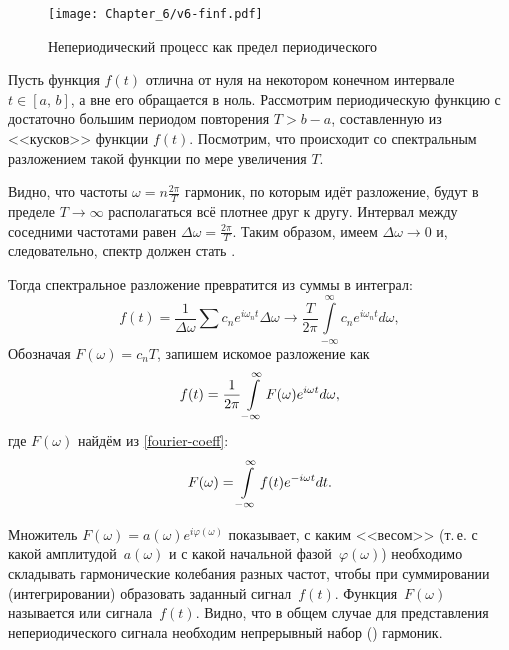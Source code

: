 \begin{wrapfigure}[9]{o}{0.5\textwidth}
    \centering\texttt{[image: Chapter\_6/v6-finf.pdf]}
    \caption{Непериодический процесс как предел периодического}
\end{wrapfigure}

Пусть функция $f(t)$ отлична от нуля на некотором конечном интервале
$t\in[a,\,b]$, а вне его обращается в ноль. Рассмотрим периодическую функцию
с достаточно большим периодом повторения $T>b-a$, составленную из <<кусков>>
функции $f(t)$. Посмотрим, что происходит со спектральным разложением
такой функции по мере увеличения $T$.

Видно, что частоты $\omega = n \frac{2\pi}{T}$ гармоник, по которым идёт
разложение, будут в пределе $T\to \infty$ располагаться всё плотнее друг к другу.
Интервал между соседними частотами равен $\Delta \omega = \frac{2\pi}{T}$.
Таким образом, имеем $\Delta \omega\to 0$ и, следовательно,
спектр должен стать .

Тогда спектральное разложение превратится из суммы в интеграл:
\begin{equation*}
 f(t) = \frac{1}{\Delta \omega}\sum c_n e^{i\omega_n t} \Delta \omega \to
 \frac{T}{2\pi} \int\limits_{-\infty}^{\infty} c_n e^{i\omega_n t} d\omega,
\end{equation*}
Обозначая $F(\omega)=c_n T$, запишем искомое разложение как
\begin{equation}
\eqmark{Fourier integral}
f(t) = \frac{1}{2\pi} \int\limits_{-\infty}^{\infty} F(\omega) e^{i\omega t} d\omega,
\end{equation}
где $F(\omega)$ найдём из \eqref{fourier-coeff}:
\begin{equation}
\eqmark{Fourier integral-coef}
 F(\omega) =
\int\limits_{-\infty}^{\infty} f(t) e^{-i\omega t} dt.
\end{equation}

Множитель $F(\omega)=a(\omega)e^{i\varphi(\omega)}$ показывает, с каким
<<весом>> (т.\,е. с какой амплитудой~$a(\omega)$ и с какой начальной 
фазой~$\varphi(\omega)$) необходимо складывать гармонические
колебания разных частот, чтобы при суммировании (интегрировании) образовать
заданный сигнал~$f(t)$. Функция~$F(\omega)$ называется 
или  сигнала~$f(t)$.
Видно, что в общем случае для представления
непериодического сигнала необходим непрерывный набор () гармоник.

